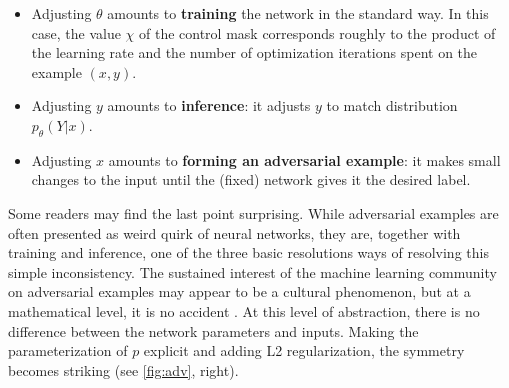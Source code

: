 \documentclass{article} %
\theoremstyle{plain}
\theoremstyle{definition}
\theoremstyle{remark}
\let\cite\citep
\begin{document}
\begin{itemize}[nosep,itemsep=3pt, left=2em]
   \item Adjusting $\theta$
   amounts to \textbf{training} the network in the standard way.
       In this case, the value $\chi$ of the control mask corresponds roughly
       to the product of the learning rate and the number of optimization iterations spent on the example $(x,y)$.

   \item Adjusting $y$
   amounts to \textbf{inference}:
   it adjusts $y$ to match distribution $p_\theta(Y|x)$.

   \item Adjusting $x$
   amounts to \textbf{forming an adversarial example}: it makes small changes to the input
   until the (fixed) network gives it the desired label.
\end{itemize}

Some readers may find the last point surprising. 
While adversarial examples \citep{goodfellow2014explaining} are often presented as weird quirk of neural networks,
   they are, together with training and inference, one of the three basic resolutions ways of resolving this simple inconsistency.
% 
The sustained interest of the machine learning community on adversarial examples
   may appear to be a cultural phenomenon,
   but at a mathematical level, it is no accident \citep{shafahi2018adversarial}.
At this level of abstraction, there is no difference between
   the network parameters and inputs.
Making the parameterization of $p$ explicit and adding L2 regularization,
the symmetry
becomes striking (see \cref{fig:adv}, right).
\end{document}

